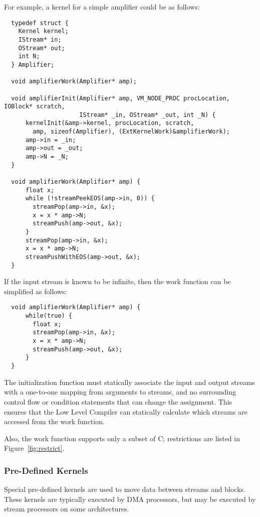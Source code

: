For example, a kernel for a simple amplifier could be as follows:
 
{\small
\begin{verbatim}
  typedef struct {
    Kernel kernel;
    IStream* in;
    OStream* out;
    int N;
  } Amplifier;

  void amplifierWork(Amplifier* amp);

  void amplifierInit(Amplifier* amp, VM_NODE_PROC procLocation, IOBlock* scratch, 
                     IStream* _in, OStream* _out, int _N) {
      kernelInit(&amp->kernel, procLocation, scratch, 
        amp, sizeof(Amplifier), (ExtKernelWork)&amplifierWork);
      amp->in = _in;
      amp->out = _out;
      amp->N = _N;
  }
 
  void amplifierWork(Amplifier* amp) {
      float x;
      while (!streamPeekEOS(amp->in, 0)) {
        streamPop(amp->in, &x);
        x = x * amp->N;
        streamPush(amp->out, &x);
      }
      streamPop(amp->in, &x);
      x = x * amp->N;
      streamPushWithEOS(amp->out, &x);
  }
\end{verbatim}}

\noindent If the input stream is known to be infinite, then the work
function can be simplified as follows:

{\small
\begin{verbatim}
  void amplifierWork(Amplifier* amp) {
      while(true) {
        float x;
        streamPop(amp->in, &x);
        x = x * amp->N;
        streamPush(amp->out, &x);
      }
  }
\end{verbatim}}

\clearpage
{}

The initialization function must statically associate the input and
output streams with a one-to-one mapping from arguments to streams,
and no surrounding control flow or condition statements that can
change the assignment.  This ensures that the Low Level Compiler can
statically calculate which streams are accessed from the work
function.

Also, the work function supports only a subset of C; restrictions are
listed in Figure~\ref{fig:restrict}.

\subsubsection{Pre-Defined Kernels}
\label{sec:kernelsvm}

\label{sec:predef}

Special pre-defined kernels are used to move data between streams and
blocks. These kernels are typically executed by DMA processors, but
may be executed by stream processors on some architectures.

